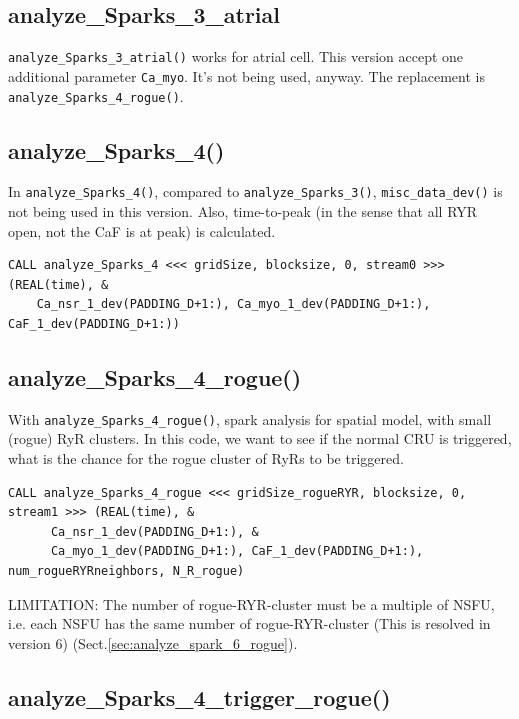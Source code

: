 \subsection{analyze\_Sparks\_3\_atrial}

\verb!analyze_Sparks_3_atrial()! works for atrial cell. This version accept one
additional parameter \verb!Ca_myo!. It's not being used, anyway. The replacement
is \verb!analyze_Sparks_4_rogue()!.

\subsection{analyze\_Sparks\_4()}
\label{sec:analyze_spark_4}

In \verb!analyze_Sparks_4()!, compared to \verb!analyze_Sparks_3()!,
\verb!misc_data_dev()! is not being used in this version. Also, time-to-peak (in
the sense that all RYR open, not the CaF is at peak) is calculated.
\begin{verbatim}
CALL analyze_Sparks_4 <<< gridSize, blocksize, 0, stream0 >>> (REAL(time), &
    Ca_nsr_1_dev(PADDING_D+1:), Ca_myo_1_dev(PADDING_D+1:), CaF_1_dev(PADDING_D+1:))
\end{verbatim}

\subsection{analyze\_Sparks\_4\_rogue()}
\label{sec:analyze_spark_4_rogue}

With \verb!analyze_Sparks_4_rogue()!, spark analysis for spatial model, with
small (rogue) RyR clusters.  In this code, we want to see if the normal CRU is
triggered, what is the chance for the rogue cluster of RyRs to be triggered.
\begin{verbatim}
CALL analyze_Sparks_4_rogue <<< gridSize_rogueRYR, blocksize, 0, stream1 >>> (REAL(time), &
      Ca_nsr_1_dev(PADDING_D+1:), &
      Ca_myo_1_dev(PADDING_D+1:), CaF_1_dev(PADDING_D+1:), num_rogueRYRneighbors, N_R_rogue)
\end{verbatim}
LIMITATION: The number of rogue-RYR-cluster must be a multiple of NSFU, i.e.
each NSFU has the same number of rogue-RYR-cluster (This is resolved in version
6) (Sect.\ref{sec:analyze_spark_6_rogue}).

\subsection{analyze\_Sparks\_4\_trigger\_rogue()}
\label{sec:analyze_spark_4_trigger_rogue}

